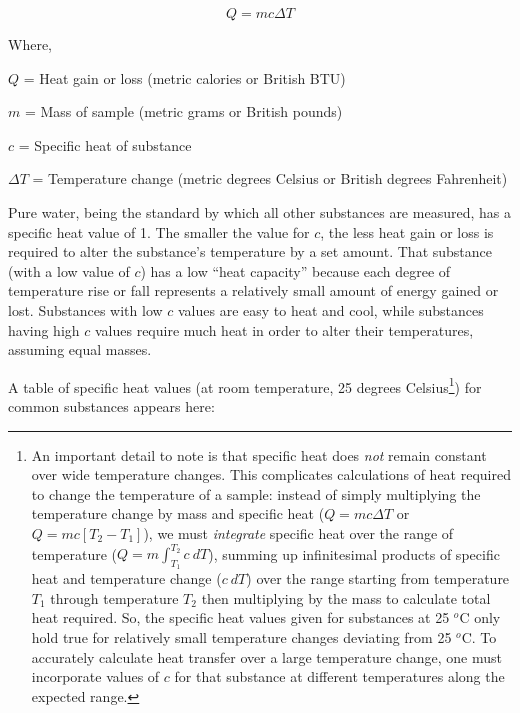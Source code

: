 $$Q = mc \Delta T$$

\noindent
Where,

$Q$ = Heat gain or loss (metric calories or British BTU)

$m$ = Mass of sample (metric grams or British pounds)

$c$ = Specific heat of substance

$\Delta T$ = Temperature change (metric degrees Celsius or British degrees Fahrenheit)

\vskip 10pt

Pure water, being the standard by which all other substances are measured, has a specific heat value of 1.  The smaller the value for $c$, the less heat gain or loss is required to alter the substance's temperature by a set amount.  That substance (with a low value of $c$) has a low ``heat capacity'' because each degree of temperature rise or fall represents a relatively small amount of energy gained or lost.  Substances with low $c$ values are easy to heat and cool, while substances having high $c$ values require much heat in order to alter their temperatures, assuming equal masses.

\filbreak

A table of specific heat values (at room temperature, 25 degrees Celsius\footnote{An important detail to note is that specific heat does \textit{not} remain constant over wide temperature changes.  This complicates calculations of heat required to change the temperature of a sample: instead of simply multiplying the temperature change by mass and specific heat ($Q = mc \Delta T$ or $Q = mc [T_2 - T_1]$), we must \textit{integrate} specific heat over the range of temperature ($Q = m \int_{T_1}^{T_2} c \> dT$), summing up infinitesimal products of specific heat and temperature change ($c \> dT$) over the range starting from temperature $T_1$ through temperature $T_2$ then multiplying by the mass to calculate total heat required.  So, the specific heat values given for substances at 25 $^{o}$C only hold true for relatively small temperature changes deviating from 25 $^{o}$C.  To accurately calculate heat transfer over a large temperature change, one must incorporate values of $c$ for that substance at different temperatures along the expected range.}) for common substances appears here:


